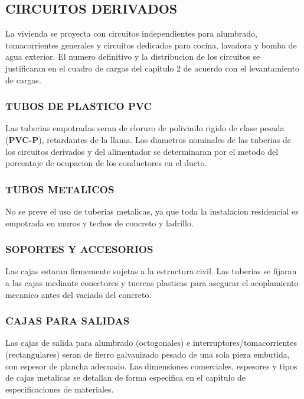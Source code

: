 \subsection{CIRCUITOS DERIVADOS}

La vivienda se proyecta con circuitos independientes para alumbrado, tomacorrientes generales y circuitos dedicados para cocina, lavadora y bomba de agua exterior. El numero definitivo y la distribucion de los circuitos se justificaran en el cuadro de cargas del capitulo 2 de acuerdo con el levantamiento de cargas.

\subsubsection{TUBOS DE PLASTICO PVC}

Las tuberias empotradas seran de cloruro de polivinilo rigido de clase pesada (\textbf{PVC-P}), retardantes de la llama. Los diametros nominales de las tuberias de los circuitos derivados y del alimentador se determinaran por el metodo del porcentaje de ocupacion de los conductores en el ducto.

\subsubsection{TUBOS METALICOS}

No se preve el uso de tuberias metalicas, ya que toda la instalacion residencial es empotrada en muros y techos de concreto y ladrillo.

\subsubsection{SOPORTES Y ACCESORIOS}

Las cajas estaran firmemente sujetas a la estructura civil. Las tuberias se fijaran a las cajas mediante conectores y tuercas plasticas para asegurar el acoplamiento mecanico antes del vaciado del concreto.

\subsubsection{CAJAS PARA SALIDAS}

Las cajas de salida para alumbrado (octogonales) e interruptores/tomacorrientes (rectangulares) seran de fierro galvanizado pesado de una sola pieza embutida, con espesor de plancha adecuado. Las dimensiones comerciales, espesores y tipos de cajas metalicas se detallan de forma especifica en el capitulo de especificaciones de materiales.

